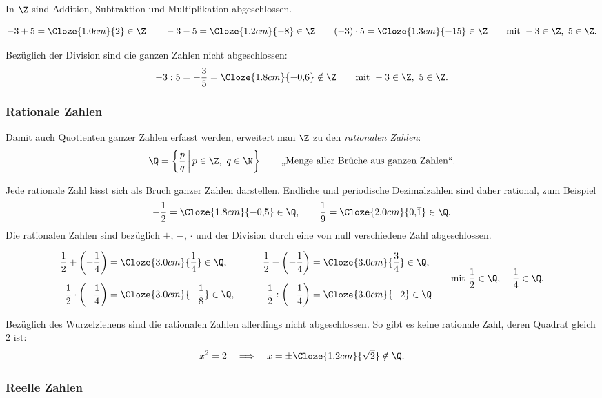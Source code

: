 In $\Z$ sind Addition, Subtraktion und Multiplikation abgeschlossen.

\[
  -3+5=\Cloze{1.0cm}{2}\in\Z
  \qquad
  -3-5=\Cloze{1.2cm}{-8}\in\Z
  \qquad
  (-3)\cdot5=\Cloze{1.3cm}{-15}\in\Z
  \qquad \text{mit } -3\in\Z,\ 5\in\Z.
\]

Bezüglich der Division sind die ganzen Zahlen nicht abgeschlossen:
\[
  -3:5=-\frac35=\Cloze{1.8cm}{-0{,}6}\notin\Z
  \qquad \text{mit } -3\in\Z,\ 5\in\Z.
\]

\subsubsection{Rationale Zahlen}
\label{subsubsec:fundamentals_rational_numbers}

Damit auch Quotienten ganzer Zahlen erfasst werden, erweitert man $\Z$ zu den
\emph{rationalen Zahlen}:
\[
  \Q=\left\{\frac pq\,\middle|\,p\in\Z,\ q\in\N\right\}
  \qquad \text{„Menge aller Brüche aus ganzen Zahlen“}.
\]
\begin{center}
  \begingroup
    \def\NumberSetStage{3}
  \endgroup
\end{center}
Jede rationale Zahl lässt sich als Bruch ganzer Zahlen darstellen. Endliche
und periodische Dezimalzahlen sind daher rational, zum Beispiel
\[
  -\frac12=\Cloze{1.8cm}{-0{,}5}\in\Q,
  \qquad
  \frac19=\Cloze{2.0cm}{0{,}\overline{1}}\in\Q.
\]
Die rationalen Zahlen sind bezüglich $+$, $-$, $\cdot$ und der Division durch
eine von null verschiedene Zahl abgeschlossen.

\[
  \begin{aligned}
    \frac12+\left(-\frac14\right)
      &=\Cloze{3.0cm}{\frac14}\in\Q,
    &\qquad
    \frac12-\left(-\frac14\right)
      &=\Cloze{3.0cm}{\frac34}\in\Q,\\[0.5em]
    \frac12\cdot\left(-\frac14\right)
      &=\Cloze{3.0cm}{-\frac18}\in\Q,
    &\qquad
    \frac12:\left(-\frac14\right)
      &=\Cloze{3.0cm}{-2}\in\Q
  \end{aligned}
  \qquad
  \text{mit } \frac12\in\Q,\ -\frac14\in\Q.
\]

Bezüglich des Wurzelziehens sind die rationalen Zahlen allerdings nicht
abgeschlossen. So gibt es keine rationale Zahl, deren Quadrat gleich $2$ ist:
\[
  x^2=2
  \quad\Longrightarrow\quad
  x=\pm\Cloze{1.2cm}{\sqrt2}\notin\Q.
\]

\subsubsection{Reelle Zahlen}
\label{subsubsec:fundamentals_real_numbers}

